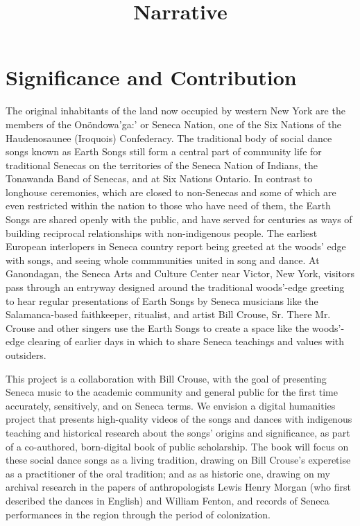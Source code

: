 \documentclass{neh}
\title{Narrative}
\begin{document}
\maketitle
\section{Significance and Contribution}
The original inhabitants of the land now occupied by western New York are the
members of the Onöndowa’ga:’ or Seneca Nation, one of the Six Nations of the
Haudenosaunee (Iroquois) Confederacy.
The traditional body of social dance songs known as Earth Songs still form a
central part of community life for traditional Senecas on the territories of
the Seneca Nation of Indians, the Tonawanda Band of Senecas, and at Six
Nations Ontario.
In contrast to longhouse ceremonies, which are closed to non-Senecas and some
of which are even restricted within the nation to those who have need of them,
the Earth Songs are shared openly with the public, and have served for
centuries as ways of building reciprocal relationships with non-indigenous
people.
The earliest European interlopers in Seneca country report being greeted at
the woods' edge with songs, and seeing whole commmunities united in song and
dance.
At Ganondagan, the Seneca Arts and Culture Center near Victor, New York,
visitors pass through an entryway designed around the traditional woods'-edge
greeting to hear regular presentations of Earth Songs by Seneca musicians like
the Salamanca-based faithkeeper, ritualist, and artist Bill Crouse, Sr.
There Mr. Crouse and other singers use the Earth Songs to create a space like
the woods'-edge clearing of earlier days in which to share Seneca teachings
and values with outsiders.

This project is a collaboration with Bill Crouse, with the goal of presenting
Seneca music to the academic community and general public for the first time
accurately, sensitively, and on Seneca terms.
We envision a digital humanities project that presents high-quality videos of
the songs and dances with indigenous teaching and historical research about
the songs' origins and significance, as part of a co-authored, born-digital
book of public scholarship.
The book will focus on these social dance songs as a living tradition, drawing
on Bill Crouse's experetise as a practitioner of the oral tradition; and as as
historic one, drawing on my archival research in the papers of anthropologists
Lewis Henry Morgan (who first described the dances in English) and William
Fenton, and records of Seneca performances in the region through the
period of colonization.
\end{document}
